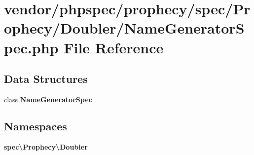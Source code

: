 \section{vendor/phpspec/prophecy/spec/\+Prophecy/\+Doubler/\+Name\+Generator\+Spec.php File Reference}
\label{_name_generator_spec_8php}
\subsection*{Data Structures}
\begin{DoxyCompactItemize}
\item 
class {\bf Name\+Generator\+Spec}
\end{DoxyCompactItemize}
\subsection*{Namespaces}
\begin{DoxyCompactItemize}
\item 
 {\bf spec\textbackslash{}\+Prophecy\textbackslash{}\+Doubler}
\end{DoxyCompactItemize}
